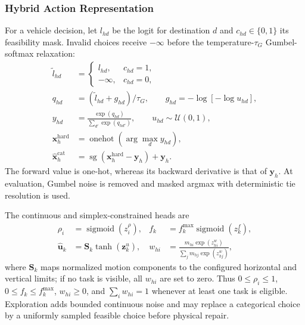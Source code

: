 \documentclass[journal]{IEEEtran}
\begin{document}
\subsubsection{Hybrid Action Representation}
For a vehicle decision, let $l_{hd}$ be the logit for destination $d$ and
$c_{hd}\in\{0,1\}$ its feasibility mask.  Invalid choices receive
$-\infty$ before the temperature-$\tau_G$ Gumbel-softmax relaxation:
\begin{equation}
\begin{aligned}
\widetilde l_{hd}&=
\begin{cases}l_{hd},&c_{hd}=1,\\-\infty,&c_{hd}=0,\end{cases}\\
q_{hd}&=(\widetilde l_{hd}+g_{hd})/\tau_G,
\qquad g_{hd}=-\log[-\log u_{hd}],\\
y_{hd}&=\frac{\exp(q_{hd})}{\sum_{d'}\exp(q_{hd'})},
\qquad u_{hd}\sim\mathcal U(0,1),\\
\boldsymbol x_h^{\mathrm{hard}}
&=\operatorname{onehot}(\arg\max_d y_{hd}),\\
\widehat{\boldsymbol x}_h^{\mathrm{cat}}
&=\operatorname{sg}(\boldsymbol x_h^{\mathrm{hard}}
-\boldsymbol y_h)+\boldsymbol y_h.
\end{aligned}
\label{eq:gumbel_action}
\end{equation}
The forward value is one-hot, whereas its backward derivative is that of
$\boldsymbol y_h$.  At evaluation, Gumbel noise is removed and masked argmax
with deterministic tie resolution is used.

The continuous and simplex-constrained heads are
\begin{equation}
\begin{aligned}
\rho_i&=\operatorname{sigmoid}(z_i^{\rho}),&
f_k&=f_k^{\max}\operatorname{sigmoid}(z_k^f),\\
\widehat{\boldsymbol u}_k&=
\boldsymbol S_k\tanh(\boldsymbol z_k^u),&
w_{hi}&=\frac{m_{hi}\exp(z_{hi}^w)}
{\sum_{j}m_{hj}\exp(z_{hj}^w)},
\end{aligned}
\label{eq:continuous_heads}
\end{equation}
where $\boldsymbol S_k$ maps normalized motion components to the configured
horizontal and vertical limits; if no task is visible, all $w_{hi}$ are set
to zero.  Thus $0\le\rho_i\le1$, $0\le f_k\le f_k^{\max}$,
$w_{hi}\ge0$, and $\sum_iw_{hi}=1$ whenever at least one task is eligible.
Exploration adds bounded continuous noise and may replace a categorical choice
by a uniformly sampled feasible choice before physical repair.
\end{document}
